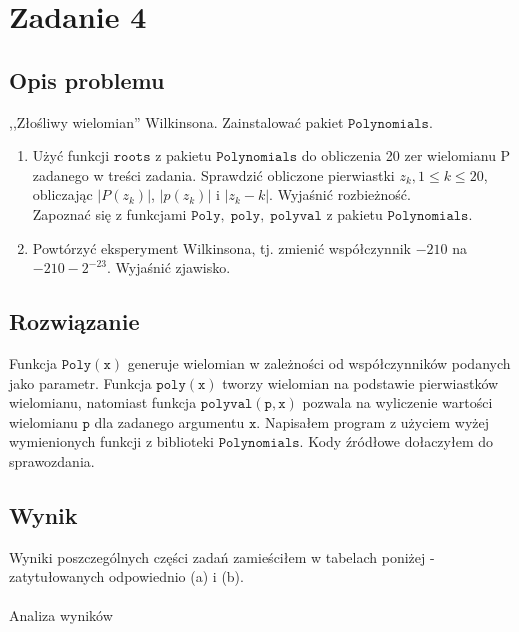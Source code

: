 \section{Zadanie 4}
\subsection{Opis problemu}
,,Złośliwy wielomian'' Wilkinsona. Zainstalować pakiet $ \mathtt{Polynomials} $.
\begin{enumerate}[label=(\alph*)]
  \item Użyć funkcji $ \mathtt{roots} $ z pakietu $ \mathtt{Polynomials} $ do obliczenia 20 zer wielomianu P zadanego w treści zadania. Sprawdzić obliczone pierwiastki $ z_k, 1 \leq k \leq 20 $, obliczając $|P(z_k)|$, $|p(z_k)|$ i $|z_k - k|$. Wyjaśnić rozbieżność. \\
  Zapoznać się z funkcjami $ \mathtt{Poly},\; \mathtt{poly},\; \mathtt{polyval}$ z pakietu $ \mathtt{Polynomials} $.
  \item Powtórzyć eksperyment Wilkinsona, tj. zmienić współczynnik $-210$ na $ -210-2^{-23}$. Wyjaśnić zjawisko.
\end{enumerate}
\subsection{Rozwiązanie}
Funkcja $ \mathtt{Poly(x)} $ generuje wielomian w zależności od współczynników podanych jako parametr.
Funkcja $ \mathtt{poly(x)} $ tworzy wielomian na podstawie pierwiastków wielomianu, natomiast funkcja $ \mathtt{polyval(p, x)} $ pozwala na wyliczenie wartości wielomianu $ \mathtt{p} $ dla zadanego argumentu $ \mathtt{x} $. Napisałem program z użyciem wyżej wymienionych funkcji z biblioteki $ \mathtt{Polynomials} $. Kody źródłowe dołaczyłem do sprawozdania. 

\subsection{Wynik}
Wyniki poszczególnych części zadań zamieściłem w tabelach poniżej - zatytułowanych odpowiednio (a) i (b). \\\\
Analiza wyników
\begin{center}
  
\end{center}